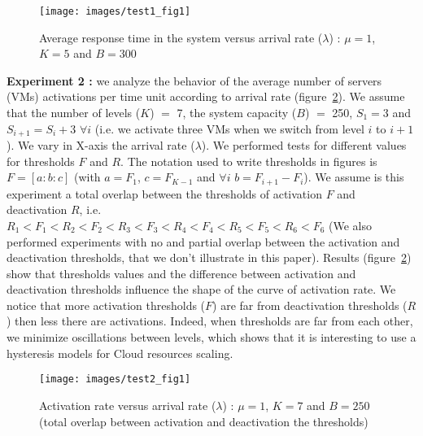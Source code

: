 \documentclass[conference]{IEEEtran}
\begin{document}
\begin{figure}[!t]
\centering
\texttt{[image: images/test1\_fig1]}
\caption{Average response time in the system versus arrival rate ($\lambda$) : $\mu=1$, $K=5$ and $B=300$}
\label{fig:image-chap4-1_par_1-test1_fig1}
\end{figure}

\textbf{Experiment 2 :} we analyze the behavior of the average number of servers (VMs) activations per time unit according to arrival rate (figure~\ref{fig:image-chap4-1_par_1_test2_fig1}). We assume that the number of levels ($K$) $=$ 7, the system capacity ($B$) $=$ 250, $S_{1}=3$ and $S_{i+1}=S_{i}+3$ $\forall i$ (i.e. we activate three VMs when we switch from level $i$ to $i+1$). We vary in X-axis the arrival rate ($\lambda$). We performed tests for different values for thresholds $F$ and $R$. The notation used to write thresholds in figures is $F=[a:b:c]$ (with $a=F_1$, $c=F_{K-1}$ and $\forall i$ $b=F_{i+1}-F_{i}$). We assume is this experiment a total overlap between the thresholds of activation $F$ and deactivation $R$, i.e. $R_1 < F_1 < R_2 < F_2 < R_3 < F_3 < R_4 < F_4 < R_5 < F_5 < R_6 < F_6$ (We also performed experiments with no and partial overlap between the activation and deactivation thresholds, that we don't illustrate in this paper). Results (figure~\ref{fig:image-chap4-1_par_1_test2_fig1}) show that thresholds values and the difference between activation and deactivation thresholds influence the shape of the curve of activation rate. We notice that more activation thresholds ($F$) are far from deactivation thresholds ($R$) then less there are activations. Indeed, when thresholds are far from each other, we minimize oscillations between levels, which shows that it is interesting to use a hysteresis models for Cloud resources scaling.

\begin{figure}[!t]
\centering
\texttt{[image: images/test2\_fig1]}
\caption{Activation rate versus arrival rate ($\lambda$) : $\mu=1$, $K=7$ and $B=250$ (total overlap between activation and deactivation the thresholds)}
\label{fig:image-chap4-1_par_1_test2_fig1}
\end{figure}
\end{document}
